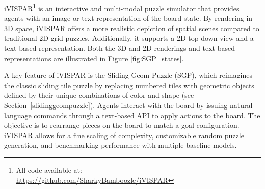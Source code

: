 iVISPAR\footnote{All code available at: \\
\href{https://github.com/SharkyBamboozle/iVISPAR}{https://github.com/SharkyBamboozle/iVISPAR}} is an interactive and multi-modal puzzle simulator that provides agents with an image or text representation of the board state. By rendering in 3D space, iVISPAR offers a more realistic depiction of spatial scenes compared to traditional 2D grid puzzles. Additionally, it supports a 2D top-down view and a text-based representation. Both the 3D and 2D renderings and text-based representations are illustrated in Figure \ref{fig:SGP_states}. 

A key feature of iVISPAR is the Sliding Geom Puzzle (SGP), which reimagines the classic sliding tile puzzle by replacing numbered tiles with geometric objects defined by their unique combinations of color and shape (see Section~\ref{slidinggeompuzzle}). Agents interact with the board by issuing natural language commands through a text-based API to apply actions to the board. The objective is to rearrange pieces on the board to match a goal configuration. iVISPAR allows for a fine scaling of complexity, customizable random puzzle generation, and benchmarking performance with multiple baseline models. 